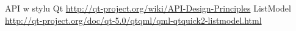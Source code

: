 \documentclass[11pt,twoside,a4paper,final]{article}
\begin{document}





\begin{thebibliography}{}

API w stylu Qt \url{http://qt-project.org/wiki/API-Design-Principles}
ListModel \url{http://qt-project.org/doc/qt-5.0/qtqml/qml-qtquick2-listmodel.html}

\end{thebibliography}
\end{document}
